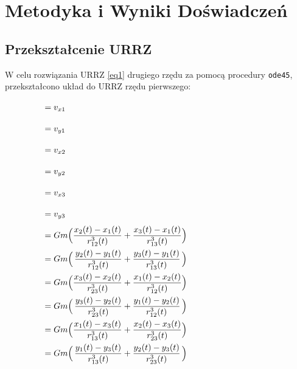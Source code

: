 \documentclass[a4paper, 12pt, twoside, openany]{article}
\begin{document}
	
	\section{Metodyka i Wyniki Doświadczeń}
	
	\subsection{Przekształcenie URRZ}
	W celu rozwiązania URRZ \eqref{eq1} drugiego rzędu za pomocą procedury \texttt{ode45}, przekształcono układ do URRZ rzędu pierwszego:
	\begin{equation}	
		\label{eq2}
		\hspace{-5cm}
		\left\{
		\begin{alignedat}{4}			
			\dfrac{dx_1(t)}{dt} & = v_{x1} \\
			\dfrac{dy_1(t)}{dt} & = v_{y1} \\
			\dfrac{dx_2(t)}{dt} & = v_{x2} \\
			\dfrac{dy_2(t)}{dt} & = v_{y2} \\
			\dfrac{dx_3(t)}{dt} & = v_{x3} \\
			\dfrac{dy_3(t)}{dt} & = v_{y3} \\
			\dfrac{dv_{x1}(t)}{dt} & = Gm \Big( & \dfrac{x_2(t) - x_1(t)}{r^3_{12}(t)} & + \dfrac{x_3(t) - x_1(t)}{r^3_{13}(t)} & \Big) \\
			\dfrac{dv_{y1}(t)}{dt} & = Gm \Big( & \dfrac{y_2(t) - y_1(t)}{r^3_{12}(t)} & + \dfrac{y_3(t) - y_1(t)}{r^3_{13}(t)} & \Big) \\
			\dfrac{dv_{x2}(t)}{dt} & = Gm \Big( & \dfrac{x_3(t) - x_2(t)}{r^3_{23}(t)} & + \dfrac{x_1(t) - x_2(t)}{r^3_{12}(t)} & \Big) \\
			\dfrac{dv_{y2}(t)}{dt} & = Gm \Big( & \dfrac{y_3(t) - y_2(t)}{r^3_{23}(t)} & + \dfrac{y_1(t) - y_2(t)}{r^3_{12}(t)} & \Big) \\
			\dfrac{dv_{x3}(t)}{dt} & = Gm \Big( & \dfrac{x_1(t) - x_3(t)}{r^3_{13}(t)} & + \dfrac{x_2(t) - x_3(t)}{r^3_{23}(t)} & \Big) \\
			\dfrac{dv_{y3}(t)}{dt} & = Gm \Big( & \dfrac{y_1(t) - y_3(t)}{r^3_{13}(t)} & + \dfrac{y_2(t) - y_3(t)}{r^3_{23}(t)} & \Big)
		\end{alignedat}
		\right.
	\end{equation}
	
\end{document}
